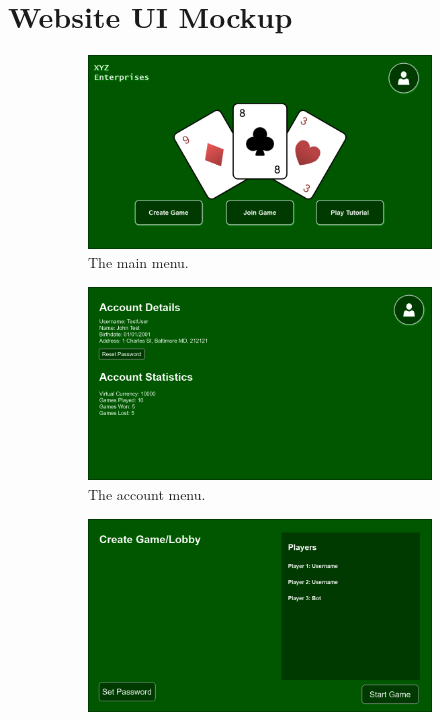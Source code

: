 \documentclass{article}
\begin{document}
\section{Website UI Mockup}
\begin{figure}[h]
\centering
\begin{subfigure}{0.5\textwidth}
  \centering
  \includegraphics[width=.99\linewidth]{Menu.png}
  \caption{\label{fig:menu}The main menu.}
\end{subfigure}%
\begin{subfigure}{0.5\textwidth}
  \centering
  \includegraphics[width=.99\linewidth]{Account.png}
  \caption{\label{fig:account}The account menu.}
\end{subfigure}
\begin{subfigure}{0.5\textwidth}
  \centering
  \includegraphics[width=.99\linewidth]{Create.png}

\end{subfigure}
\end{figure}
\end{document}
